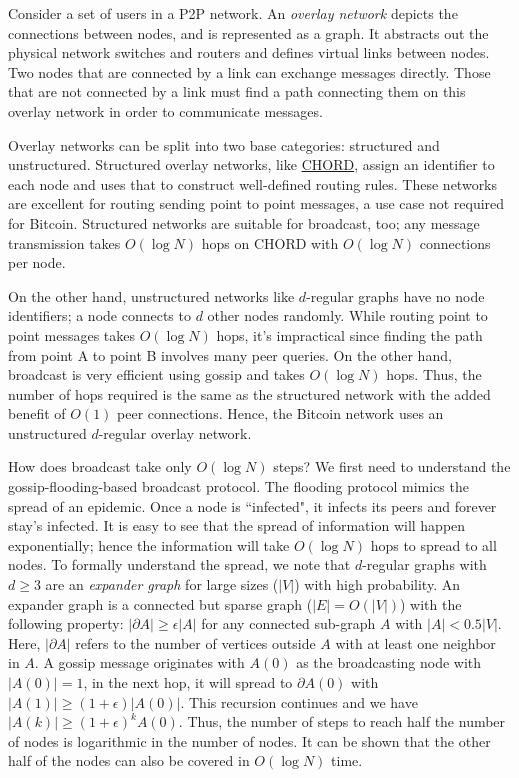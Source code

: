 \documentclass{article}
\begin{document}
Consider a set of users in a P2P network. An \textit{overlay network} depicts the connections between nodes, and is represented as a graph. It abstracts out the physical network switches and routers and defines virtual links between nodes. Two nodes that are connected by a link can exchange messages directly. Those that are not connected by a link must find a path connecting them on this overlay network in order to communicate messages.

Overlay networks can be split into two base categories: structured and unstructured. Structured overlay networks, like \href{https://en.wikipedia.org/wiki/Chord_(peer-to-peer)}{CHORD}, assign an identifier to each node and uses that to construct well-defined routing rules. These networks are excellent for routing sending point to point messages, a use case not required for Bitcoin. Structured networks are suitable for broadcast, too; any message transmission takes $O(\log N)$ hops on CHORD with $O(\log N)$ connections per node.

On the other hand, unstructured networks like $d$-regular graphs have no node identifiers; a node connects to $d$ other nodes randomly. While routing point to point messages takes $O(\log N)$ hops, it's impractical since finding the path from point A to point B involves many peer queries. On the other hand, broadcast is very efficient using gossip and takes $O(\log N)$ hops. Thus, the number of hops required is the same as the structured network with the added benefit of $O(1)$ peer connections. Hence, the Bitcoin network uses an unstructured $d$-regular overlay network. 

How does broadcast take only $O(\log N)$ steps? We first need to understand the gossip-flooding-based broadcast protocol. The flooding protocol mimics the spread of an epidemic. Once a node is ``infected", it infects its peers and forever stay's infected. It is easy to see that the spread of information will happen exponentially; hence the information will take $O(\log N)$ hops to spread to all nodes. To formally understand the spread, we note that $d$-regular graphs with $d\geq 3$ are an \textit{expander graph} for large sizes ($|V|$) with high probability. An expander graph is a connected but sparse graph ($|E|=O(|V|)$) with the following property: $|\partial A| \geq \epsilon|A|$ for any connected sub-graph $A$ with $|A|<0.5|V|$. Here, $|\partial A|$ refers to the number of vertices outside $A$ with at least one neighbor in $A$. A gossip message originates with $A(0)$ as the broadcasting node with $|A(0)|=1$, in the next hop, it will spread to $\partial A(0)$ with $|A(1)|\geq (1+\epsilon)|A(0)|$. This recursion continues and we have $|A(k)|\geq(1+\epsilon)^kA(0)$. Thus, the number of steps to reach half the number of nodes is logarithmic in the number of nodes. It can be shown that the other half of the nodes can also be covered in $O(\log N)$ time.
\end{document}
